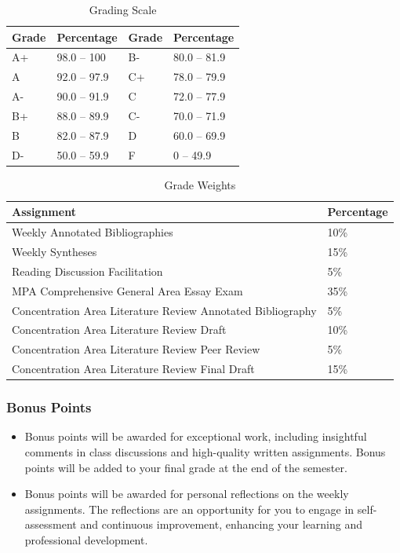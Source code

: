 \documentclass[12pt, letterpaper]{article}
\begin{document}
\begin{table}[h]
\centering
\caption{Grading Scale}
\begin{tabular}{llll}
\toprule
\textbf{Grade} & \textbf{Percentage} & \textbf{Grade} & \textbf{Percentage} \\
\midrule
A+ & 98.0 -- 100 & B- & 80.0 -- 81.9\\
A & 92.0 -- 97.9 & C+ & 78.0 -- 79.9\\
A- & 90.0 -- 91.9 & C & 72.0 -- 77.9\\
B+ & 88.0 -- 89.9 & C- & 70.0 -- 71.9\\
B & 82.0 -- 87.9 & D & 60.0 -- 69.9\\
D- & 50.0 -- 59.9 & F & 0 -- 49.9\\

\bottomrule
\end{tabular}
\label{tab:grading-scale}
\end{table}

\begin{table}[h!]
    \centering
    \caption{Grade Weights}
    \begin{tabular}{ll}
        \toprule
    \textbf{Assignment} & \textbf{Percentage} \\
    \midrule
    Weekly Annotated Bibliographies & 10\% \\
    Weekly Syntheses & 15\% \\
    Reading Discussion Facilitation & 5\% \\
    MPA Comprehensive General Area Essay Exam & 35\% \\
    Concentration Area Literature Review Annotated Bibliography & 5\% \\
    Concentration Area Literature Review Draft & 10\% \\
    Concentration Area Literature Review Peer Review & 5\% \\
    Concentration Area Literature Review Final Draft & 15\% \\
    \bottomrule
    \end{tabular}
    \label{tab:grade-weights}
    \end{table}
    
    \subsubsection*{Bonus Points}
    \begin{itemize}
        \item Bonus points will be awarded for exceptional work, including insightful comments in class discussions and high-quality written assignments. Bonus points will be added to your final grade at the end of the semester.
        \item Bonus points will be awarded for personal reflections on the weekly assignments. The reflections are an opportunity for you to engage in self-assessment and continuous improvement, enhancing your learning and professional development.
    \end{itemize}
    
\end{document}
